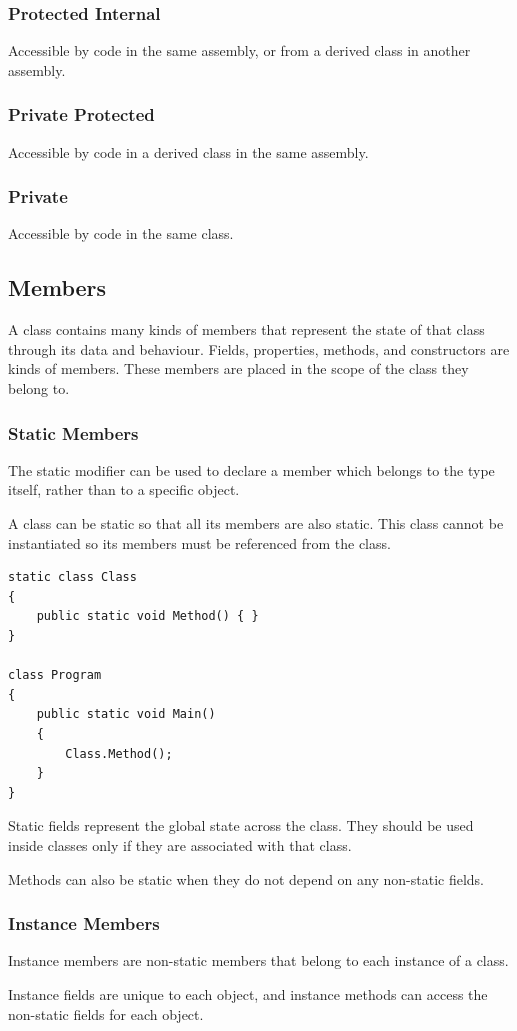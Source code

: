 \documentclass{article}
\begin{document}
\subsubsection{Protected Internal}
Accessible by code in the same assembly, or from a derived class in another assembly.
\subsubsection{Private Protected}
Accessible by code in a derived class in the same assembly.
\subsubsection{Private}
Accessible by code in the same class.
\subsection{Members}
A class contains many kinds of members that represent the state of that class through its data and behaviour.
Fields, properties, methods, and constructors are kinds of members.
These members are placed in the scope of the class they belong to.
\subsubsection{Static Members}
The static modifier can be used to declare a member which belongs to the type itself,
rather than to a specific object.

A class can be static so that all its members are also static. This class cannot be
instantiated so its members must be referenced from the class.
\begin{lstlisting}
static class Class 
{
    public static void Method() { }
}

class Program 
{
    public static void Main() 
    {
        Class.Method();
    } 
}
\end{lstlisting}
Static fields represent the global state across the class.
They should be used inside classes only if they are associated with that class.

Methods can also be static when they do not depend on any non-static fields.
\subsubsection{Instance Members}
Instance members are non-static members that belong to each instance of a class.

Instance fields are unique to each object, and instance methods can access the
non-static fields for each object.
\end{document}
